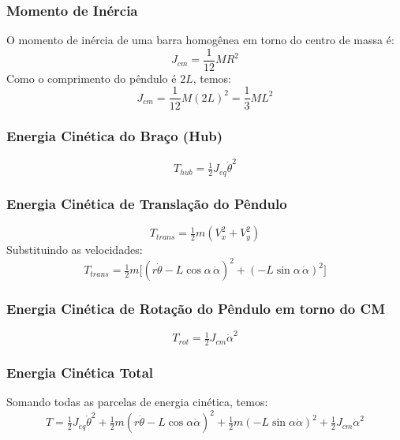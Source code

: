 \documentclass[9pt,a4paper,twocolumn,twoside]{tau-class/tau}
\begin{document}
\subsubsection*{Momento de Inércia}
O momento de inércia de uma barra homogênea em torno do centro de massa é:
\begin{equation}
    J_{cm} = \frac{1}{12} M R^2
\end{equation}
Como o comprimento do pêndulo é $2L$, temos:
\begin{equation}
    J_{cm} = \frac{1}{12} M (2L)^2 = \frac{1}{3} M L^2
\end{equation}

\subsubsection*{Energia Cinética do Braço (Hub)}
\begin{equation}
    T_{hub} = \tfrac{1}{2} J_{eq} \dot{\theta}^2
\end{equation}

\subsubsection*{Energia Cinética de Translação do Pêndulo}
\begin{equation}
    T_{trans} = \tfrac{1}{2} m (V_x^2 + V_y^2)
\end{equation}
Substituindo as velocidades:
\begin{equation}
    T_{trans} = \tfrac{1}{2} m \Big[ (r \dot{\theta} - L \cos \alpha \, \dot{\alpha})^2 + (-L \sin \alpha \, \dot{\alpha})^2 \Big]
\end{equation}

\subsubsection*{Energia Cinética de Rotação do Pêndulo em torno do CM}
\begin{equation}
    T_{rot} = \tfrac{1}{2} J_{cm} \dot{\alpha}^2
\end{equation}

\subsubsection*{Energia Cinética Total}

Somando todas as parcelas de energia cinética, temos:
\begin{equation}
    T = \tfrac{1}{2} J_{eq} \dot{\theta}^2 
        + \tfrac{1}{2} m (r \dot{\theta} - L \cos\alpha \dot{\alpha})^2
        + \tfrac{1}{2} m (-L \sin\alpha \dot{\alpha})^2
        + \tfrac{1}{2} J_{cm} \dot{\alpha}^2
    \label{eq:Ttotal1}
\end{equation}
\end{document}
